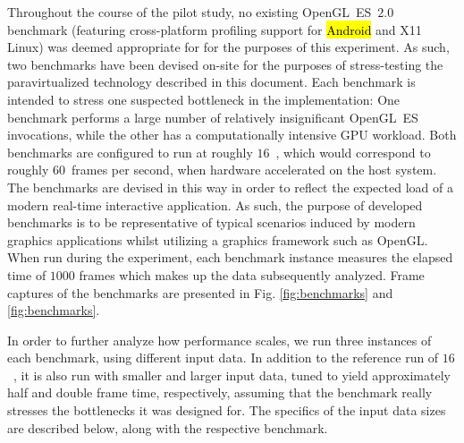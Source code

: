 Throughout the course of the pilot study, no existing OpenGL~ES~$2.0$ benchmark (featuring cross-platform profiling support for \hl{Android} and X11 Linux) was deemed appropriate for for the purposes of this experiment.
As such, two benchmarks have been devised on-site for the purposes of stress-testing the paravirtualized technology described in this document.
Each benchmark is intended to stress one suspected bottleneck in the implementation: One benchmark performs a large number of relatively insignificant OpenGL~ES invocations, while the other has a computationally intensive GPU workload.
Both benchmarks are configured to run at roughly $16$~\milli\second , which would correspond to roughly $60$~frames per second, when hardware accelerated on the host system.
The benchmarks are devised in this way in order to reflect the expected load of a modern real-time interactive application.
As such, the purpose of developed benchmarks is to be representative of typical scenarios induced by modern graphics applications whilst utilizing a graphics framework such as OpenGL.
When run during the experiment, each benchmark instance measures the elapsed time of $1000$ frames which makes up the data subsequently analyzed.
Frame captures of the benchmarks are presented in Fig. \ref{fig:benchmarks} and \ref{fig:benchmarks}.

In order to further analyze how performance scales, we run three instances of each benchmark, using different input data.
In addition to the reference run of $16$~\milli\second , it is also run with smaller and larger input data, tuned to yield approximately half and double frame time, respectively, assuming that the benchmark really stresses the bottlenecks it was designed for.
The specifics of the input data sizes are described below, along with the respective benchmark.

